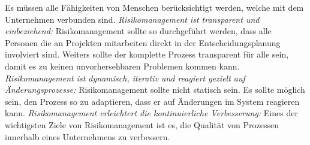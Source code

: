 \documentclass{report}
\begin{document}
\newline
Es müssen alle Fähigkeiten von Menschen berücksichtigt werden, welche mit dem Unternehmen verbunden sind.
\newline
\newline
\emph{Risikomanagement ist transparent und einbeziehend:}
\newline
Risikomanagement sollte so durchgeführt werden, dass alle Personen die an Projekten mitarbeiten direkt in der Entscheidungsplanung involviert sind. Weiters sollte der komplette Prozess transparent für alle sein, damit es zu keinen unvorhersehbaren Problemen kommen kann. 
\newline
\newline
\emph{Risikomanagement ist dynamisch, iterativ und reagiert gezielt auf Änderungsprozesse:}
\newline
Risikomanagement sollte nicht statisch sein. Es sollte möglich sein, den Prozess so zu adaptieren,  dass er auf Änderungen im System reagieren kann.  
\newline
\newline
\emph{Risikomanagement erleichtert die kontinuierliche Verbesserung:}
\newline
Eines der wichtigsten Ziele von Risikomanagement ist es, die Qualität von Prozessen innerhalb eines Unternehmens zu verbessern. 
\end{document}

